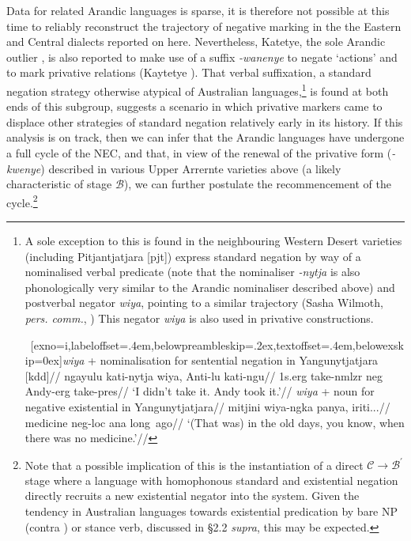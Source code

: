 Data for related Arandic languages is sparse, it is therefore not possible at this time to reliably reconstruct the trajectory of negative marking in the the Eastern and Central dialects reported on here. Nevertheless, Katetye, the sole Arandic outlier \citep[see][]{Hale1962,Koch2004}, is also reported to make use of a suffix \textit{-wanenye} to negate `actions' and to mark privative relations (Kaytetye \citeyear[826]{Kaytetye2012}). That verbal suffixation, a standard negation strategy otherwise atypical of Australian languages,\footnote{A sole exception to this is found in the neighbouring Western Desert varieties (including Pitjantjatjara [\gls{pjt}]) express standard negation by way of a nominalised verbal predicate (note that the nominaliser \textit{-nytja} is also phonologically very similar to the Arandic nominaliser described above) and postverbal negator \textit{wiya}, pointing to a similar trajectory (Sasha Wilmoth, \textit{pers. comm.}, \citeyear{Wilmoth2020}) This negator \textit{wiya} is also used in privative constructions. 


\pex~[exno=i,labeloffset=.4em,belowpreambleskip=.2ex,textoffset=.4em,belowexskip=0ex]\a\begingl\glpreamble \textit{wiya} + nominalisation for sentential negation in Yangunytjatjara [\gls{kdd}]//
\gla ngayulu kati-nytja wiya, Anti-lu kati-ngu//
\glb 1s.\gls{erg} take-\gls{nmlzr} \gls{neg} Andy-\gls{erg} take-\gls{pres}//
\glft`I didn't take it. Andy took it.'//\endgl
\a\begingl\glpreamble \textit{wiya} + noun for negative existential in Yangunytjatjara//
\gla mitjini wiya-ngka panya, iriti...//
\glb medicine \gls{neg}-\gls{loc} \gls{ana} long~ago//
\glft`(That was) in the old days, you know, when there was no medicine.'//\endgl \xe

} is found at both ends of this subgroup, suggests a scenario in which privative markers came to displace other strategies of standard negation relatively early in its history. If this analysis is on track, then we can infer that the Arandic languages have undergone a full cycle of the NEC, and that, in view of the renewal of the privative form (\textit{-kwenye}) described in various Upper Arrernte varieties above (a likely characteristic of stage $\mathcal B$), we can further postulate the recommencement of the cycle.\footnote{Note that a possible implication of this is the instantiation of a direct $\mathcal{C\to B^\prime}$ stage where a language with homophonous standard and existential negation directly recruits a new existential negator into the system. Given the tendency in Australian languages towards existential predication by bare NP (contra \citealt{Croft1991}) or stance verb, discussed in §2.2 \textit{supra}, this may be expected.
	
}
